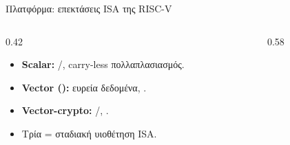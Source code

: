 \begin{frame}{Πλατφόρμα: επεκτάσεις ISA της RISC-V}
  \begin{columns}[T]
    \begin{column}{0.42\textwidth}
      \begin{itemize}
        \item \textbf{Scalar:} \Zbc/\Zbb, \clmul carry-less πολλαπλασιασμός.
        \item \textbf{Vector (\RVV):} ευρεία δεδομένα, .
        \item \textbf{Vector-crypto:} \Zvbc/\Zvbb, \vclmul.
        \item Τρία  = σταδιακή υιοθέτηση ISA.
      \end{itemize}
    \end{column}
    \begin{column}{0.58\textwidth}
      \resizebox{\linewidth}{!}{}
    \end{column}
  \end{columns}
\end{frame}
